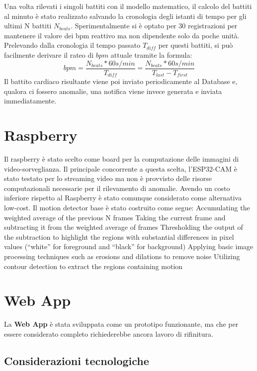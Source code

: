 Una volta rilevati i singoli battiti con il modello matematico, il calcolo del battiti al minuto è stato realizzato salvando la cronologia degli istanti di tempo per gli ultimi N battiti $N_{beats}$. Sperimentalmente si è optato per 30 registrazioni per mantenere il valore dei bpm reattivo ma non dipendente solo da poche unità. Prelevando dalla cronologia il tempo passato $T_{diff}$ per questi battiti, si può facilmente derivare il rateo di $bpm$ attuale tramite la formula: 
\begin{equation}
bpm = \frac{ N_{beats}*60 s/min }{T_{diff}} = \frac{ N_{beats}*60 s/min }{T_{last}-T_{first}} 
\end{equation}
Il battito cardiaco risultante viene poi inviato periodicamente al Database e, qualora ci fossero anomalie, una notifica viene invece generata e inviata immediatamente.

\section{Raspberry}
Il raspberry è stato scelto come board per la computazione delle immagini di video-sorveglianza. 
Il principale concorrente a questa scelta, l'ESP32-CAM è stato testato per lo streaming video ma non è provvisto delle risorse computazionali necessarie per il rilevamento di anomalie. 
Avendo un costo inferiore rispetto al Raspberry è stato comunque considerato come alternativa low-cost. 
Il motion detector base è stato costruito come segue:
Accumulating the weighted average of the previous N frames
Taking the current frame and subtracting it from the weighted average of frames
Thresholding the output of the subtraction to highlight the regions with substantial differences in pixel values (“white” for foreground and “black” for background)
Applying basic image processing techniques such as erosions and dilations to remove noise
Utilizing contour detection to extract the regions containing motion

\section{Web App}

    
    La \textbf{Web App} è stata sviluppata come un prototipo funzionante, ma che per essere considerato completo richiederebbe ancora lavoro di rifinitura.
    
    \subsection{Considerazioni tecnologiche}
    
